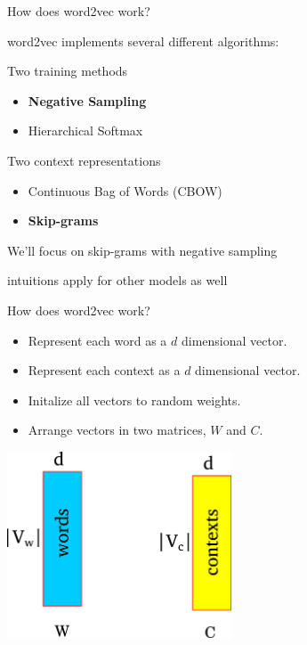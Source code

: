 \documentclass[compress]{beamer}
\begin{document}
\begin{frame}{How does word2vec work?}

    word2vec implements several different algorithms:

    \begin{block}{Two training methods}
    \begin{itemize}
        \item \textbf<2>{Negative Sampling}
        \item Hierarchical Softmax
    \end{itemize}
    \end{block}
    \begin{block}{Two context representations}
    \begin{itemize}
        \item Continuous Bag of Words (CBOW)
        \item \textbf<2>{Skip-grams}
    \end{itemize}
    \end{block}

    \pause
    \vspace{1em}
    We'll focus on skip-grams with negative sampling

    \vspace{1em}
    intuitions apply for other models as well
\end{frame}

\begin{frame}{How does word2vec work?}
    \begin{itemize}
        \item Represent each word as a $d$ dimensional vector.
        \item Represent each context as a $d$ dimensional vector.
        \item Initalize all vectors to random weights.
        \item Arrange vectors in two matrices, $W$ and $C$.
    \end{itemize}
    \includegraphics[width=0.5\textwidth]{distsim/WC.png}
\end{frame}
\end{document}
